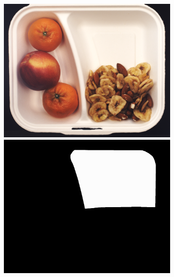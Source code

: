 \begin{figure}[H]
    \centering
    \begin{subfigure}[b]{\textwidth}
        \centering
        \begin{minipage}{0.45\textwidth}
            \centering
            \includegraphics[width=\textwidth]{figures/appendix/appendix_DRAEM/BB/129.png}
            \includegraphics[width=\textwidth]{figures/appendix/appendix_DRAEM/BB/129_m.png}

\end{minipage}
\end{subfigure}
\end{figure}

